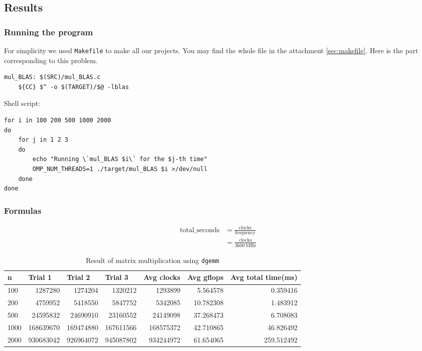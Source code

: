 \documentclass[12pt]{article}
\begin{document}
\subsection{Results}
\subsubsection{Running the program}

For simplicity we used \texttt{Makefile} to make all our projects.
You may find the whole file in the attachment \autoref{sec:makefile}.
Here is the part corresponding to this problem.
\begin{lstlisting}
mul_BLAS: $(SRC)/mul_BLAS.c
	${CC} $^ -o $(TARGET)/$@ -lblas
\end{lstlisting}

Shell script:
\begin{lstlisting}
for i in 100 200 500 1000 2000
do
    for j in 1 2 3
    do
        echo "Running \`mul_BLAS $i\` for the $j-th time"
        OMP_NUM_THREADS=1 ./target/mul_BLAS $i >/dev/null
    done
done
\end{lstlisting}

\subsubsection{Formulas}
\begin{equation}
  \begin{aligned}
    \text{total\_seconds} & = \frac{\text{clocks}}{\text{frequency}} \\
                          & = \frac{\text{clocks}}{\SI{3600}{\MHz}}
  \end{aligned}
\end{equation}
\begin{table}[H]
  \centering
  \begin{tabular}{lrrrrrr}
    \toprule
    \multicolumn{1}{l}{n}          &
    \multicolumn{1}{l}{Trial 1}    &
    \multicolumn{1}{l}{Trial 2}    &
    \multicolumn{1}{l}{Trial 3}    &
    \multicolumn{1}{l}{Avg clocks} &
    \multicolumn{1}{l}{Avg gflops} &
    \multicolumn{1}{l}{Avg total time(\si{\milli\second})}                                                  \\
    \midrule
    100                            & 1287280   & 1274204   & 1320212   & 1293899   & 5.564578  & 0.359416   \\
    200                            & 4759952   & 5418550   & 5847752   & 5342085   & 10.782308 & 1.483912   \\
    500                            & 24595832  & 24690910  & 23160552  & 24149098  & 37.268473 & 6.708083   \\
    1000                           & 168639670 & 169474880 & 167611566 & 168575372 & 42.710865 & 46.826492  \\
    2000                           & 930683042 & 926964072 & 945087802 & 934244972 & 61.654065 & 259.512492 \\
    \bottomrule
  \end{tabular}
  \caption{Result of matrix multiplication using \lstinline{dgemm}}
\end{table}
\end{document}
